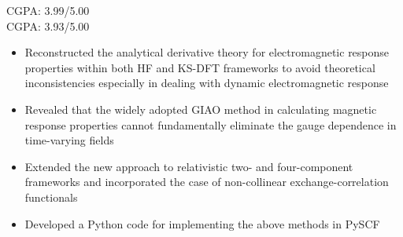\documentclass[10pt,a4paper]{altacv}
\begin{document}

\begin{fullwidth}
\makecvheader
\end{fullwidth}


\textsc{CGPA}: 3.99/5.00
\\
\textsc{CGPA}: 3.93/5.00


\begin{itemize}
\item Reconstructed the analytical derivative theory for electromagnetic response properties within both HF and KS-DFT frameworks to avoid theoretical inconsistencies especially in dealing with dynamic electromagnetic response
\item Revealed that the widely adopted GIAO method in calculating magnetic response properties cannot fundamentally eliminate the gauge dependence in time-varying fields
\item Extended the new approach to relativistic two- and four-component frameworks and incorporated the case of non-collinear exchange-correlation functionals
\item Developed a Python code for implementing the above methods in PySCF
\end{itemize}
\end{document}
